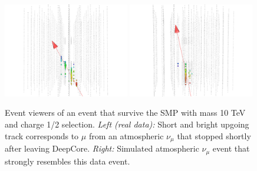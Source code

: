 \begin{appendices}
\begin{figure}
\centering
\includegraphics[width=0.49\textwidth]{appendix/img/FINAL_data_m_10000_ch1ovr2_1.png}
\includegraphics[width=0.49\textwidth]{appendix/img/FINAL_data_m_10000_ch1ovr2_1_NUMUANOLOGY.png}
\caption{Event viewers of an event that survive the SMP with mass 10 TeV and charge 1/2 selection. \textit{Left (real data): } Short and bright upgoing track corresponds to $\mu$ from an atmospheric $\nu_\mu$ that stopped shortly after leaving DeepCore. \textit{Right: }Simulated atmospheric $\nu_\mu$ event that strongly resembles this data event.}
\label{fig:final_1}
\end{figure}


\end{appendices}
